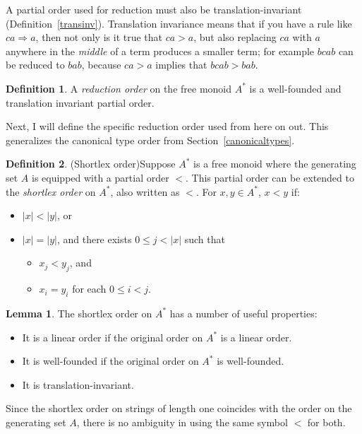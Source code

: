 \documentclass[a4paper,headsepline,bibliography=totoc,toc=flat,fleqn,twoside=semi]{scrbook}
\theoremstyle{definition}
\newtheorem{definition}{Definition}[chapter]
\theoremstyle{definition}
\theoremstyle{definition}
\newtheorem{lemma}{Lemma}[chapter]
\begin{document}
A partial order used for reduction must also be translation-invariant (Definition~\ref{transinv}). Translation invariance means that if you have a rule like $ca\Rightarrow a$, then not only is it true that $ca>a$, but also replacing $ca$ with $a$ anywhere in the \emph{middle} of a term produces a smaller term; for example $bcab$ can be reduced to $bab$, because $ca>a$ implies that $bcab>bab$.
\begin{definition}A \emph{reduction order} on the free monoid $A^*$ is a well-founded and translation invariant partial order.
\end{definition}
Next, I will define the specific reduction order used from here on out. This generalizes the canonical type order from Section~\ref{canonicaltypes}.

\begin{definition}(Shortlex order)\label{shortlex}
Suppose $A^*$ is a free monoid where the generating set $A$ is equipped with a partial order $<$. This partial order can be extended to the \emph{shortlex order} on $A^*$, also written as $<$. For $x, y\in A^*$, $x<y$ if:
\begin{itemize}
\item $|x|<|y|$, or
\item $|x|=|y|$, and there exists $0\le j<|x|$ such that
\begin{itemize}
\item $x_j<y_j$, and
\item $x_i=y_i$ for each $0\le i<j$.
\end{itemize}
\end{itemize}
\end{definition}
\begin{lemma} The shortlex order on $A^*$ has a number of useful properties:
\begin{itemize}
\item It is a linear order if the original order on $A^*$ is a linear order.
\item It is well-founded if the original order on $A^*$ is well-founded.
\item It is translation-invariant.
\end{itemize}
\end{lemma}
Since the shortlex order on strings of length one coincides with the order on the generating set $A$, there is no ambiguity in using the same symbol $<$ for both.
\end{document}
